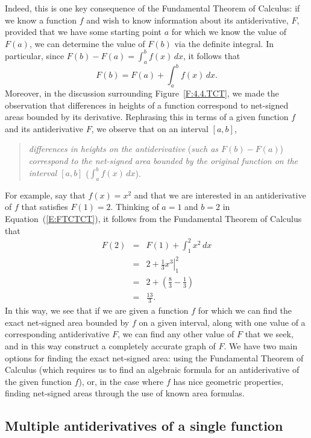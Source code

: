 Indeed, this is one key consequence of the Fundamental Theorem of Calculus:  if we know a function $f$ and wish to know information about its antiderivative, $F$, provided that we have some starting point $a$ for which we know the value of $F(a)$, we can determine the value of $F(b)$ via the definite integral.  In particular, since $F(b) - F(a) = \int_a^b f(x) \, dx$, it follows that 
\begin{equation} \label{E:FTCTCT}
F(b) = F(a) + \int_a^b f(x) \, dx.
\end{equation}
Moreover, in the discussion surrounding Figure~\ref{F:4.4.TCT}, we made the observation that differences in heights of a function correspond to net-signed areas bounded by its derivative.  Rephrasing this in terms of a given function $f$ and its antiderivative $F$, we observe that on an interval $[a,b]$,
\begin{quote}
\emph{differences in heights on the antiderivative} (\emph{such as $F(b) - F(a)$}) \emph{correspond to the net-signed area bounded by the original function on the interval $[a,b]$} ($\int_a^b f(x) \, dx$).
\end{quote}
For example, say that $f(x) = x^2$ and that we are interested in an antiderivative of $f$ that satisfies $F(1) = 2$.  Thinking of $a = 1$ and $b = 2$ in Equation~(\ref{E:FTCTCT}), it follows from the Fundamental Theorem of Calculus that
\begin{eqnarray*}
F(2) & = & F(1) + \int_1^2 x^2 \, dx \\
	& = & 2 + \left. \frac{1}{3}x^3 \right|_1^2 \\
	& = & 2 + \left(\frac{8}{3} - \frac{1}{3}\right) \\
	& = & \frac{13}{3}.
\end{eqnarray*}
In this way, we see that if we are given a function $f$ for which we can find the exact net-signed area bounded by $f$ on a given interval, along with one value of a corresponding antiderivative $F$, we can find any other value of $F$ that we seek, and in this way construct a completely accurate graph of $F$.  We have two main options for finding the exact net-signed area:  using the Fundamental Theorem of Calculus (which requires us to find an algebraic formula for an antiderivative of the given function $f$), or, in the case where $f$ has nice geometric properties, finding net-signed areas through the use of known area formulas.



\subsection*{Multiple antiderivatives of a single function}%


